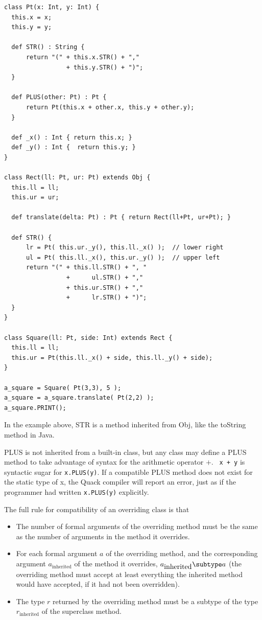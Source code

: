 \documentclass[11pt]{article}
\begin{document}
\begin{verbatim}
class Pt(x: Int, y: Int) {
  this.x = x;
  this.y = y;

  def STR() : String {
      return "(" + this.x.STR() + "," 
                 + this.y.STR() + ")";
  }

  def PLUS(other: Pt) : Pt {
      return Pt(this.x + other.x, this.y + other.y);
  }

  def _x() : Int { return this.x; }
  def _y() : Int {  return this.y; }
}

class Rect(ll: Pt, ur: Pt) extends Obj {
  this.ll = ll;
  this.ur = ur;

  def translate(delta: Pt) : Pt { return Rect(ll+Pt, ur+Pt); }

  def STR() {
      lr = Pt( this.ur._y(), this.ll._x() );  // lower right 
      ul = Pt( this.ll._x(), this.ur._y() );  // upper left
      return "(" + this.ll.STR() + ", "
                 +      ul.STR() + "," 
                 + this.ur.STR() + ","
                 +      lr.STR() + ")";
  }
}

class Square(ll: Pt, side: Int) extends Rect {
  this.ll = ll;
  this.ur = Pt(this.ll._x() + side, this.ll._y() + side);
}
  
a_square = Square( Pt(3,3), 5 );
a_square = a_square.translate( Pt(2,2) );
a_square.PRINT();
\end{verbatim}

In the example above, STR is a method inherited from Obj, like the
toString  method in Java.  

PLUS is not inherited from a built-in
class, but any class may define a PLUS method to take advantage of
syntax for the arithmetic operator $+$. \ \verb|x + y| is syntactic
sugar for \verb|x.PLUS(y)|.  If a compatible PLUS method does not
exist for the static type of x, the Quack compiler will report an
error, just as if the programmer had written \verb|x.PLUS(y)|
explicitly. 

\medbreak

\noindent The full rule for compatibility of an overriding class is that 

\begin{itemize}
  \item The number of formal arguments of the overriding method must be  
    the same as the number of arguments in the method it overrides. 
  \item For each formal argument $a$ of the overriding method, and the
    corresponding argument 
      \( a_{\mbox{inherited}} \) 
    of the method it
    overrides, 
   \( a_{\mbox{inherited}} \subtype a \)  (the overriding method must
    accept at least everything the inherited method would have
    accepted, if it had not been overridden).  
   \item The type $r$ returned by the overriding method must 
   be a subtype of the type $r_{\mbox{inherited}}$ of the 
   superclass method. 
\end{itemize}
\end{document}
